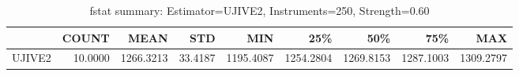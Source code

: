 \begin{table}[ht]
\centering
\caption{fstat summary: Estimator=UJIVE2, Instruments=250, Strength=0.60}
\begin{tabular}{lrrrrrrrr}
\toprule
 & COUNT & MEAN & STD & MIN & 25\% & 50\% & 75\% & MAX \\
\midrule
UJIVE2 & 10.0000 & 1266.3213 & 33.4187 & 1195.4087 & 1254.2804 & 1269.8153 & 1287.1003 & 1309.2797 \\
\bottomrule
\end{tabular}
\end{table}
